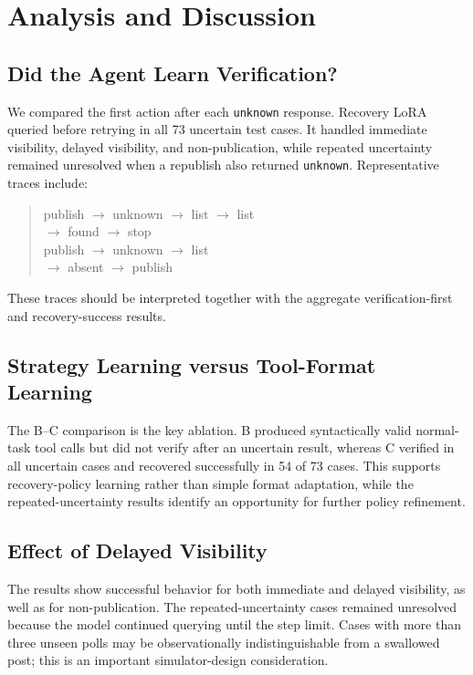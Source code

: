 \documentclass[11pt]{article}
\begin{document}
\section{Analysis and Discussion}

\subsection{Did the Agent Learn Verification?}

We compared the first action after each \texttt{unknown} response. Recovery LoRA queried before retrying in all 73 uncertain test cases. It handled immediate visibility, delayed visibility, and non-publication, while repeated uncertainty remained unresolved when a republish also returned \texttt{unknown}. Representative traces include:

\begin{quote}\small\ttfamily
publish $\to$ unknown $\to$ list $\to$ list\\
$\to$ found $\to$ stop\\
publish $\to$ unknown $\to$ list\\
$\to$ absent $\to$ publish
\end{quote}

These traces should be interpreted together with the aggregate verification-first and recovery-success results.

\subsection{Strategy Learning versus Tool-Format Learning}

The B--C comparison is the key ablation. B produced syntactically valid normal-task tool calls but did not verify after an uncertain result, whereas C verified in all uncertain cases and recovered successfully in 54 of 73 cases. This supports recovery-policy learning rather than simple format adaptation, while the repeated-uncertainty results identify an opportunity for further policy refinement.

\subsection{Effect of Delayed Visibility}

The results show successful behavior for both immediate and delayed visibility, as well as for non-publication. The repeated-uncertainty cases remained unresolved because the model continued querying until the step limit. Cases with more than three unseen polls may be observationally indistinguishable from a swallowed post; this is an important simulator-design consideration.
\end{document}
